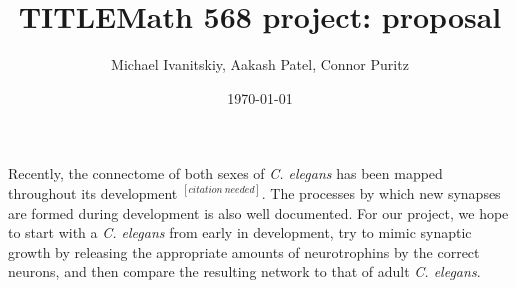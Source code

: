\documentclass{article}
\title{TITLE}
\author{Michael Ivanitskiy, Aakash Patel, Connor Puritz}
\date{\today}
\title{Math 568 project: proposal}
\newcommand{\needcite}{$^{[citation \ needed]}$}
\begin{document}
\maketitle\noindent

Recently, the connectome of both sexes of \emph{C. elegans} has been mapped throughout its development \needcite. The processes by which new synapses are formed during development is also well documented. For our project, we hope to start with a \emph{C. elegans} from early in development, try to mimic synaptic growth by releasing the appropriate amounts of neurotrophins by the correct neurons, and then compare the resulting network to that of adult \emph{C. elegans}.

{}

\end{document}
